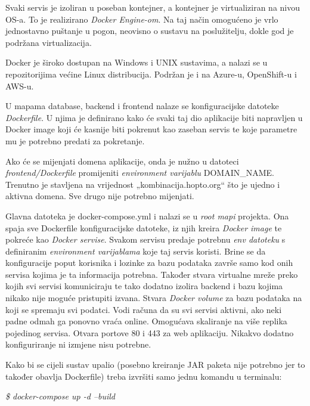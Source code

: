 		Svaki servis je izoliran u poseban kontejner, a kontejner je virtualiziran na nivou OS-a. To je realizirano  \textit{Docker Engine-om}. Na taj način omogućeno je vrlo jednostavno puštanje u pogon, neovisno o sustavu na poslužitelju, dokle god je podržana virtualizacija. 

		Docker je široko dostupan na Windows i UNIX sustavima, a nalazi se u repozitorijima većine Linux distribucija. Podržan je i na Azure-u, OpenShift-u i AWS-u.\\
		
		
		
	
		U mapama database, backend i frontend nalaze se konfiguracijske datoteke  \textit{Dockerfile}. U njima je definirano kako će svaki taj dio aplikacije biti napravljen u Docker image koji će kasnije biti pokrenut kao zaseban servis te koje parametre mu je potrebno predati za pokretanje. 
			
			Ako će se mijenjati domena aplikacije, onda je nužno u datoteci  \textit{frontend/Dockerfile} promijeniti  \textit{environment varijablu} DOMAIN\_NAME. Trenutno je stavljena na vrijednost „kombinacija.hopto.org“ što je ujedno i aktivna domena. Sve drugo nije potrebno mijenjati.
			
    			Glavna datoteka je docker-compose.yml i nalazi se u  \textit{root mapi} projekta. Ona spaja sve Dockerfile konfiguracijske datoteke, iz njih kreira  \textit{Docker image} te pokreće kao  \textit{Docker servise}. Svakom servisu predaje potrebnu  \textit{env datoteku} s definiranim  \textit{environment varijablama} koje taj servis koristi. Brine se da konfiguracije poput korisnika i lozinke za bazu podataka završe samo kod onih servisa kojima je ta informacija potrebna. Također stvara virtualne mreže preko kojih svi servisi komuniciraju te tako dodatno izolira backend i bazu kojima nikako nije moguće pristupiti izvana. Stvara  \textit{Docker volume} za bazu podataka na koji se spremaju svi podatci. Vodi računa da su svi servisi aktivni, ako neki padne odmah ga ponovno vraća online. Omogućava skaliranje na više replika pojedinog servisa. Otvara portove 80 i 443 za web aplikaciju. Nikakvo dodatno konfiguriranje ni izmjene nisu potrebne.
	
		Kako bi se cijeli sustav upalio (posebno kreiranje JAR paketa nije potrebno jer to također obavlja Dockerfile) treba izvršiti samo jednu komandu u terminalu:
		
		 \textit{\$ docker-compose up -d --build}
		

